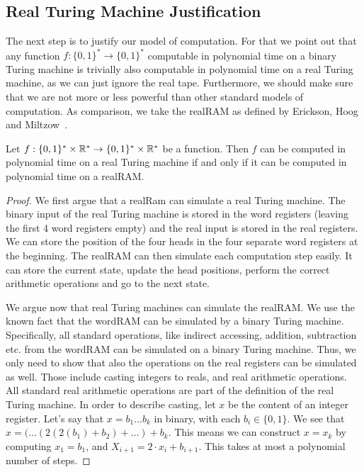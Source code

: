 \documentclass{article}
\begin{document}
\subsection{Real Turing Machine Justification}
The next step is to justify our model of computation.
For that we point out that any function $f : \{0,1\}^* \rightarrow \{0,1\}^*$ computable in polynomial time on a binary Turing machine is trivially also computable in polynomial time on a real Turing machine, as we can just ignore the real tape.
Furthermore, we should make sure that we are not more or less powerful than other standard models of computation.
As comparison, we take the realRAM as defined by Erickson, Hoog and Miltzow~\cite{EvdHM20}.

\begin{lemma}
    \label{lem:realRAMEquivalence}
    Let $f : \{0,1\}^*\times \mathbb{R}^* \rightarrow \{0,1\}^*\times \mathbb{R}^*$ be a function.
    Then $f$ can be computed in polynomial time on a real Turing machine if and only if it can be computed in polynomial time on a realRAM.
\end{lemma}
\begin{proof}
    We first argue that a realRam can simulate a real Turing machine.
    The binary input of the real Turing machine is stored in the word registers (leaving the first 4 word registers empty) and
    the real input is stored in the real registers.
    We can store the position of the four heads in the four separate word registers at the beginning.
    The realRAM can then simulate each computation step easily.
    It can store the current state, update the head positions, perform the correct arithmetic operations and go to the next state.

    We argue now that real Turing machines can simulate the realRAM.    
    We use the known fact that the wordRAM can be simulated by a binary Turing machine.
    Specifically, all standard operations, like indirect accessing, addition, subtraction etc. from the wordRAM can
    be simulated on a binary Turing machine.
    Thus, we only need to show that also the operations on the real registers can be simulated as well.
    Those include casting integers to reals, and real arithmetic operations.
    All standard real arithmetic operations  are part of the definition of the real Turing machine.
    In order to describe casting, let $x$ be the content of an integer register.
    Let's say that $x = b_1\ldots b_k$ in binary, with each $b_i \in \{0,1\}$.
    We see that $x = ( \ldots (2(2(b_1 ) + b_2)+ \ldots ) + b_k$.
    This means we can construct $x = x_k$ by computing $x_1 = b_1$, and 
    $X_{i+1} = 2\cdot x_i + b_{i+1}$. 
    This takes at most a polynomial number of steps.
\end{proof}
\end{document}
